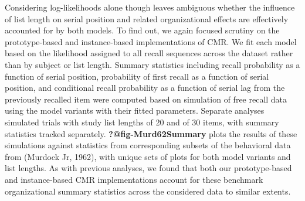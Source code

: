 \documentclass[
  letterpaper,
  DIV=11,
  numbers=noendperiod]{scrreport}
\begin{document}
Considering log-likelihoods alone though leaves ambiguous whether the
influence of list length on serial position and related organizational
effects are effectively accounted for by both models. To find out, we
again focused scrutiny on the prototype-based and instance-based
implementations of CMR. We fit each model based on the likelihood
assigned to all recall sequences across the dataset rather than by
subject or list length. Summary statistics including recall probability
as a function of serial position, probability of first recall as a
function of serial position, and conditional recall probability as a
function of serial lag from the previously recalled item were computed
based on simulation of free recall data using the model variants with
their fitted parameters. Separate analyses simulated trials with study
list lengths of 20 and of 30 items, with summary statistics tracked
separately. \textbf{?@fig-Murd62Summary} plots the results of these
simulations against statistics from corresponding subsets of the
behavioral data from (Murdock Jr, 1962), with unique sets of plots for
both model variants and list lengths. As with previous analyses, we
found that both our prototype-based and instance-based CMR
implementations account for these benchmark organizational summary
statistics across the considered data to similar extents.
\end{document}
